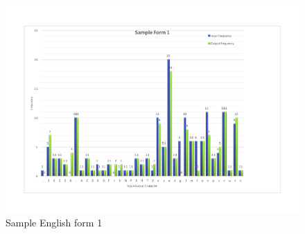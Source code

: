 \begin{figure}[H]
\centering
\includegraphics[width=1\textwidth]{form1}
\caption {Sample English form 1}
\label {fig:form1}
\end{figure}

